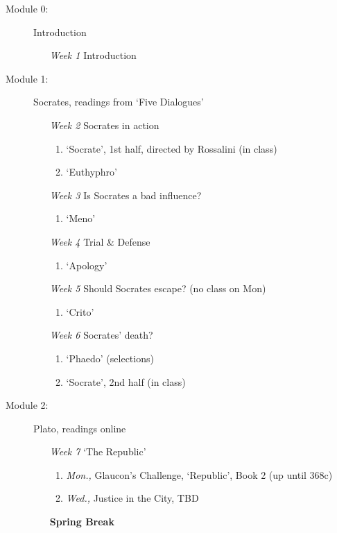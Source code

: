\documentclass[article,oneside]{memoir}
\begin{document}
\begin{description}
\item[Module 0:] {Introduction}
\begin{enumerate}
\item[\textit{Week 1}] Introduction 
\end{enumerate}

\item[Module 1:] Socrates, readings from `Five Dialogues'
\begin{enumerate}
\item[\textit{Week 2}] Socrates in action
\begin{enumerate}
\item `Socrate', 1st half, directed by Rossalini (in class)
\item `Euthyphro'
\end{enumerate}

\item[ \textit{Week 3}] Is Socrates a bad influence? 
\begin{enumerate}
\item `Meno'
\end{enumerate}

\item[ \textit{Week 4}] Trial \& Defense
\begin{enumerate}
\item `Apology'
\end{enumerate}

\item[ \textit{Week 5}] Should Socrates escape? (no class on Mon)
\begin{enumerate}
\item `Crito'
\end{enumerate}
\item[ \textit{Week 6}] Socrates' death? 
\begin{enumerate}
\item `Phaedo' (selections)
\item `Socrate', 2nd half (in class) 
\end{enumerate}
\end{enumerate}


\item[Module 2:] Plato, readings online
\begin{enumerate}
\item[\textit{Week 7}] `The Republic'
\begin{enumerate}
\item \emph{Mon.,} Glaucon's Challenge, `Republic', Book 2 (up until 368c) 
\item \emph{Wed.,} Justice in the City, TBD
\end{enumerate}
\item[\textbf{Spring Break}] \


\end{enumerate}
\end{description}
\end{document}
